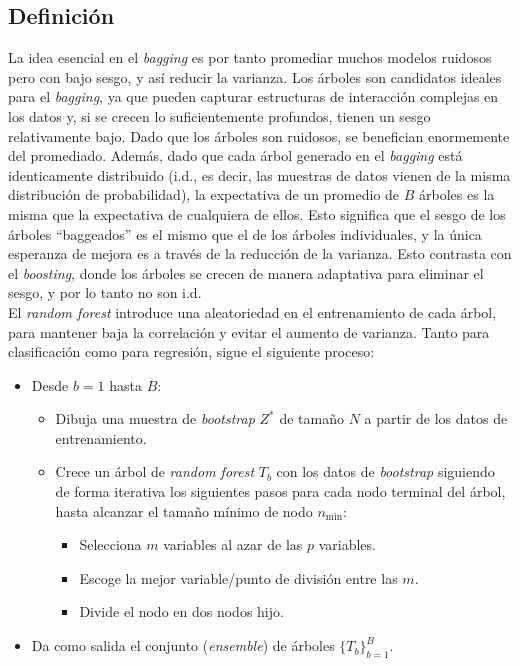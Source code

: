 \subsection{Definición}

La idea esencial en el \textit{bagging} es por tanto promediar muchos modelos ruidosos pero con bajo sesgo, y así reducir la varianza. Los árboles son candidatos ideales para el \textit{bagging}, ya que pueden capturar estructuras de interacción complejas en los datos y, si se crecen lo suficientemente profundos, tienen un sesgo relativamente bajo. Dado que los árboles son ruidosos, se benefician enormemente del promediado. Además, dado que cada árbol generado en el \textit{bagging} está identicamente distribuido (i.d., es decir, las muestras de datos vienen de la misma distribución de probabilidad), la expectativa de un promedio de $B$ árboles es la misma que la expectativa de cualquiera de ellos. Esto significa que el sesgo de los árboles ``baggeados'' es el mismo que el de los árboles individuales, y la única esperanza de mejora es a través de la reducción de la varianza. Esto contrasta con el \textit{boosting}, donde los árboles se crecen de manera adaptativa para eliminar el sesgo, y por lo tanto no son i.d. \\

El \textit{random forest} introduce una aleatoriedad en el entrenamiento de cada árbol, para mantener baja la correlación y evitar el aumento de varianza. Tanto para clasificación como para regresión, sigue el siguiente proceso:
\begin{itemize}
\item Desde $b = 1$ hasta $B$:
\begin{itemize}
\item Dibuja una muestra de \textit{bootstrap} $Z^*$ de tamaño $N$ a partir de los datos de entrenamiento.
\item Crece un árbol de \textit{random forest} $T_b$ con los datos de \textit{bootstrap} siguiendo de forma iterativa los siguientes pasos para cada nodo terminal del árbol, hasta alcanzar el tamaño mínimo de nodo $n_{\text{min}}$:
\begin{itemize}
\item Selecciona $m$ variables al azar de las $p$ variables.
\item Escoge la mejor variable/punto de división entre las $m$.
\item Divide el nodo en dos nodos hijo.
\end{itemize}
\end{itemize}
\item Da como salida el conjunto (\textit{ensemble}) de árboles $\{T_b\}_{b=1}^B$.
\end{itemize}

